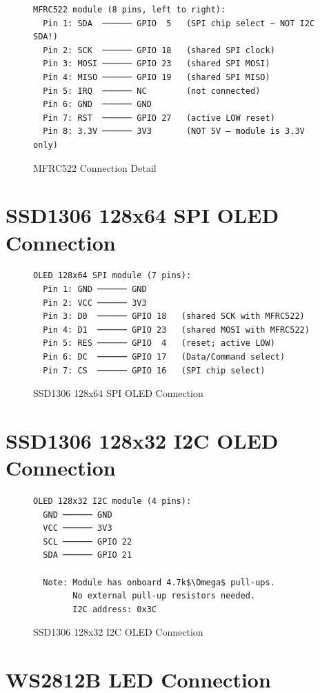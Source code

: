 \begin{figure}[H]
\centering
\begin{verbatim}
MFRC522 module (8 pins, left to right):
  Pin 1: SDA  ────── GPIO  5   (SPI chip select — NOT I2C SDA!)
  Pin 2: SCK  ────── GPIO 18   (shared SPI clock)
  Pin 3: MOSI ────── GPIO 23   (shared SPI MOSI)
  Pin 4: MISO ────── GPIO 19   (shared SPI MISO)
  Pin 5: IRQ  ────── NC        (not connected)
  Pin 6: GND  ────── GND
  Pin 7: RST  ────── GPIO 27   (active LOW reset)
  Pin 8: 3.3V ────── 3V3       (NOT 5V — module is 3.3V only)
\end{verbatim}
\caption{MFRC522 Connection Detail}
\label{fig:wiring_rfid}
\end{figure}

\section{SSD1306 128x64 SPI OLED Connection}

\begin{figure}[H]
\centering
\begin{verbatim}
OLED 128x64 SPI module (7 pins):
  Pin 1: GND ────── GND
  Pin 2: VCC ────── 3V3
  Pin 3: D0  ────── GPIO 18   (shared SCK with MFRC522)
  Pin 4: D1  ────── GPIO 23   (shared MOSI with MFRC522)
  Pin 5: RES ────── GPIO  4   (reset; active LOW)
  Pin 6: DC  ────── GPIO 17   (Data/Command select)
  Pin 7: CS  ────── GPIO 16   (SPI chip select)
\end{verbatim}
\caption{SSD1306 128x64 SPI OLED Connection}
\label{fig:wiring_oled64}
\end{figure}

\section{SSD1306 128x32 I2C OLED Connection}

\begin{figure}[H]
\centering
\begin{verbatim}
OLED 128x32 I2C module (4 pins):
  GND ────── GND
  VCC ────── 3V3
  SCL ────── GPIO 22
  SDA ────── GPIO 21

  Note: Module has onboard 4.7k$\Omega$ pull-ups.
        No external pull-up resistors needed.
        I2C address: 0x3C
\end{verbatim}
\caption{SSD1306 128x32 I2C OLED Connection}
\label{fig:wiring_oled32}
\end{figure}

\section{WS2812B LED Connection}

